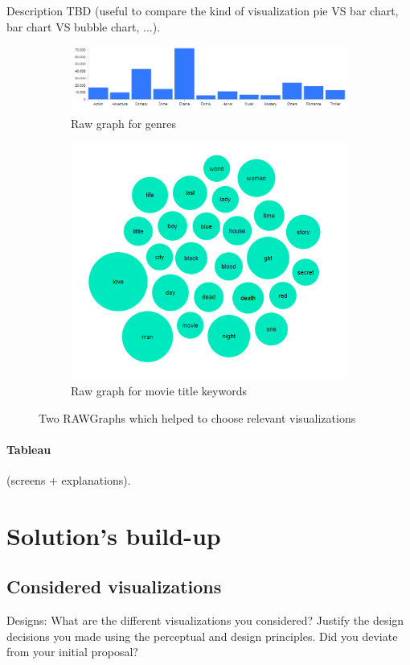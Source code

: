 \documentclass[a4paper,10pt]{article}
\begin{document}
Description TBD (useful to compare the kind of visualization pie VS bar chart,
bar chart VS bubble chart, ...).

\begin{figure}[ht]
 \begin{subfigure}{1\textwidth}
  \centering
  \includegraphics[height=0.22\linewidth]{images/drafts/rawgraphs-genres.png}
  \caption{Raw graph for genres} \label{fig:rawgraphs-genres}
 \end{subfigure}\hfill
 \begin{subfigure}{1\textwidth}
  \centering
  \includegraphics[height=0.35\linewidth]{images/drafts/rawgraphs-words.png}
  \caption{Raw graph for movie title keywords} \label{fig:rawgraphs-keywords}
 \end{subfigure}
 \caption{Two RAWGraphs which helped to choose relevant visualizations}
\end{figure}

\paragraph{Tableau} (screens + explanations).

\section{Solution's build-up}

\subsection{Considered visualizations}

Designs: What are the different visualizations you considered? Justify the design decisions you made using the perceptual and design principles.
Did you deviate from your initial proposal?
\end{document}

